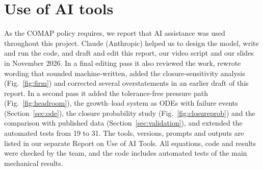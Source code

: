\documentclass[11pt]{article}
\begin{document}
\section*{Use of AI tools}
As the COMAP policy requires, we report that AI assistance was used throughout this project. Claude (Anthropic) helped us to design the model, write and run the code, and draft and edit this report, our video script and our slides in November 2026. In a final editing pass it also reviewed the work, rewrote wording that sounded machine-written, added the closure-sensitivity analysis (Fig.~\ref{fig:firm}) and corrected several overstatements in an earlier draft of this report. In a second pass it added the tolerance-free pressure path (Fig.~\ref{fig:headroom}), the growth--load system as ODEs with failure events (Section~\ref{sec:ode}), the closure probability study (Fig.~\ref{fig:closureprob}) and the comparison with published data (Section~\ref{sec:validation}), and extended the automated tests from 19 to 31. The tools, versions, prompts and outputs are listed in our separate Report on Use of AI Tools. All equations, code and results were checked by the team, and the code includes automated tests of the main mechanical results.



\end{document}
